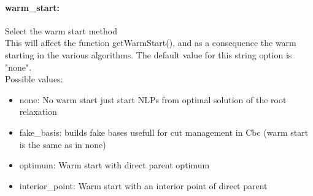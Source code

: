 \paragraph{\bf warm\_start:}\label{sec:warm_start} Select the warm start method $\;$ \\
 This will affect the function getWarmStart(), and
as a consequence the warm starting in the various
algorithms.
The default value for this string option is "none".
\\ 
Possible values:
\begin{itemize}
   \item none: No warm start just start NLPs from optimal
solution of the root relaxation
   \item fake\_basis: builds fake bases usefull for cut management in
Cbc (warm start is the same as in none)
   \item optimum: Warm start with direct parent optimum
   \item interior\_point: Warm start with an interior point of direct
parent
\end{itemize}

